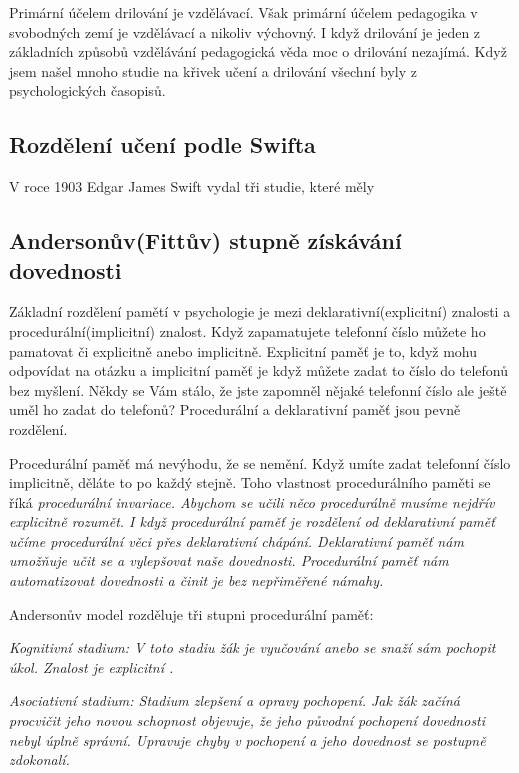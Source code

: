 Primární účelem drilování je vzdělávací.  Však primární účelem pedagogika v svobodných zemí je vzdělávací a nikoliv výchovný. I když drilování je jeden z základních způsobů vzdělávání pedagogická věda moc o drilování nezajímá. Když jsem našel mnoho studie na křivek učení a drilování všechní byly z psychologických časopisů.

\subsection{Rozdělení učení podle Swifta}

V roce 1903 Edgar James Swift vydal tři studie, které měly 

\subsection{Andersonův(Fittův) stupně získávání dovednosti} %

Základní rozdělení pamětí v psychologie je mezi deklarativní(explicitní) znalosti a procedurální(implicitní) znalost.  Když zapamatujete telefonní číslo můžete ho pamatovat či explicitně anebo implicitně. Explicitní paměť je to, když mohu odpovídat na otázku  a implicitní paměť je když můžete zadat to číslo do telefonů bez myšlení. Někdy se Vám stálo, že jste zapomněl nějaké telefonní číslo ale ještě uměl ho zadat do telefonů?  Procedurální a deklarativní paměť jsou pevně rozdělení.

Procedurální paměť má nevýhodu, že se nemění.  Když umíte zadat telefonní číslo implicitně, děláte to po každý stejně.  Toho vlastnost procedurálního paměti se říká \em procedurální invariace\em . Abychom se učili něco procedurálně musíme nejdřív explicitně rozumět.  I když procedurální paměť je rozdělení od deklarativní paměť učíme procedurální věci přes deklarativní chápání.  Deklarativní paměť nám umožňuje učit se a vylepšovat naše dovednosti.  Procedurální paměť nám automatizovat dovednosti a činit je bez nepřiměřené námahy\citep[str. 105]{robert1994handbook}.

Andersonův model rozděluje tři stupni procedurální paměť:

\em Kognitivní stadium\em : V toto stadiu žák je vyučování anebo se snaží sám pochopit úkol.  Znalost je explicitní .

\em Asociativní stadium\em : Stadium zlepšení a opravy pochopení.  Jak žák začíná procvičit jeho novou schopnost objevuje, že jeho původní pochopení dovednosti nebyl úplně správní.  Upravuje chyby v pochopení a jeho dovednost se postupně zdokonalí.

